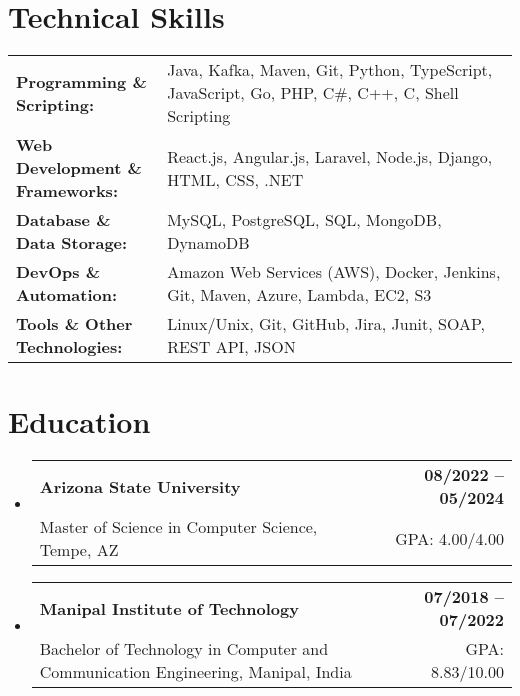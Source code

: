 \documentclass[letterpaper,11pt]{article}
\makeatletter
\newcommand{\educationSubheading}[4]{
  \vspace{-2pt}\item
    \begin{tabular*}{1.0\textwidth}[t]{l@{\extracolsep{\fill}}r}
      \textbf{\small #1} & \textbf{\small #2} \\
      {\small#3} & {\small #4} \\
    \end{tabular*}\vspace{-7pt}
}
\newcommand{\resumeSubHeadingListStart}{\begin{itemize}[leftmargin=0pt, label={}]}
\newcommand{\resumeSubHeadingListEnd}{\end{itemize}}
\makeatother
\begin{document}
\section{Technical Skills}
        \vspace{-14pt}
        \begin{table}[h]
            \footnotesize
            \begin{tabular}{p{0.3\linewidth} p{0.7\linewidth}}
                \textbf{Programming \& Scripting:} & Java, Kafka, Maven, Git, Python, TypeScript, JavaScript, Go, PHP, C\#, C++, C, Shell Scripting \\
                \textbf{Web Development \& Frameworks:} & React.js, Angular.js, Laravel, Node.js, Django, HTML, CSS, .NET \\
                \textbf{Database \& Data Storage:} & MySQL, PostgreSQL, SQL, MongoDB, DynamoDB \\
                \textbf{DevOps \& Automation:} & Amazon Web Services (AWS), Docker, Jenkins, Git, Maven, Azure, Lambda, EC2, S3 \\
                \textbf{Tools \& Other Technologies:} & Linux/Unix, Git, GitHub, Jira, Junit, SOAP, REST API, JSON \\
            \end{tabular}
        \end{table}

 \vspace{-15pt}

\section{Education}
  \resumeSubHeadingListStart
    \educationSubheading
      {Arizona State University}{08/2022 -- 05/2024}
      {Master of Science in Computer Science, Tempe, AZ}{GPA: 4.00/4.00}

    \educationSubheading
      {Manipal Institute of Technology}{07/2018 -- 07/2022}
      {Bachelor of Technology in Computer and Communication Engineering, Manipal, India}{GPA: 8.83/10.00}
  \resumeSubHeadingListEnd
\end{document}
